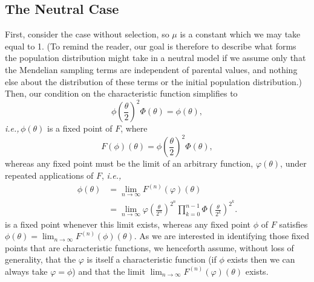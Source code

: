\documentclass{article}
\newcommand{\ie}{\textit{i.e.,}\,}
\newcommand{\1}{\mathbbm{1}}
\theoremstyle{remark}
\theoremstyle{definition}
\begin{document}
\subsection{The Neutral Case}

First, consider the case without selection, so $\mu$ is a constant
which we may take equal to 1. 
(To remind the reader, our goal is therefore to describe 
what forms the population distribution might take in a neutral model
if we assume only that the Mendelian sampling terms are independent of parental values,
and nothing else about the distribution of these terms or the initial population distribution.) 
Then, our condition on the characteristic function simplifies to
\begin{equation}\label{eq:CF_neutral}
	{\textstyle \phi\left(\frac{\theta}{2}\right)^{2}} \Phi(\theta) %
	= \phi(\theta) ,
\end{equation}
\ie $\phi(\theta)$ is a fixed point of $F$, where
 \[
	F(\phi)(\theta) = {\textstyle \phi\left(\frac{\theta}{2}\right)^{2}} \Phi(\theta),
\]
whereas any fixed point must be the limit of an arbitrary function, $\varphi(\theta)$, under repeated applications of $F$,
\ie {}
\begin{equation}\label{eq:fpeq}
\begin{aligned}
	\phi(\theta) 
    &= \lim_{n \to \infty} F^{(n)}(\varphi)(\theta) \\
    &= \lim_{n \to \infty} \varphi\left(\frac{\theta}{2^{n}}\right)^{2^{n}}\prod_{k=0}^{n-1}\Phi\left(\frac{\theta}{2^{k}}\right)^{2^{k}} .
\end{aligned}
\end{equation}
is a fixed point whenever this limit exists, whereas any fixed point $\phi$ of $F$ satisfies  $\phi(\theta) = \lim_{n \to \infty} F^{(n)}(\phi)(\theta)$.  As we are interested in identifying those fixed points that are characteristic functions, we henceforth assume, without loss of generality, that the $\varphi$ is itself a characteristic function (if $\phi$ exists then we can always take $\varphi = \phi$) and that the limit $\lim_{n \to \infty} F^{(n)}(\varphi)(\theta)$ exists.
\end{document}
